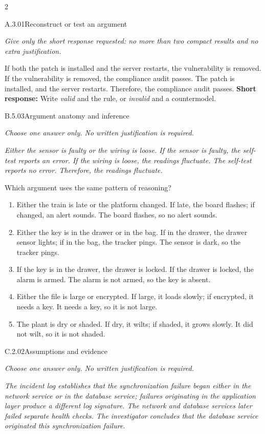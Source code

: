\documentclass[9pt]{extarticle}
\newcommand{\choice}[1]{\item #1}
\begin{document}
\begin{multicols}{2}
\begin{DenseCoreProblem}{A.3.01}{Reconstruct or test an argument}
{\scriptsize\textit{Give only the short response requested: no more than two compact results and no extra justification.}\par}
If both the patch is installed and the server restarts, the vulnerability is removed. If the vulnerability is removed, the compliance audit passes. The patch is installed, and the server restarts. Therefore, the compliance audit passes.
\textbf{Short response:} Write \emph{valid} and the rule, or \emph{invalid} and a countermodel.
\end{DenseCoreProblem}
\begin{DenseCoreProblem}{B.5.03}{Argument anatomy and inference}
{\scriptsize\textit{Choose one answer only. No written justification is required.}\par}
\emph{Either the sensor is faulty or the wiring is loose. If the sensor is faulty, the self-test reports an error. If the wiring is loose, the readings fluctuate. The self-test reports no error. Therefore, the readings fluctuate.}

Which argument uses the same pattern of reasoning?
\begin{enumerate}[label=(\alph*)]
  \choice{Either the train is late or the platform changed. If late, the board flashes; if changed, an alert sounds. The board flashes, so no alert sounds.}
  \choice{Either the key is in the drawer or in the bag. If in the drawer, the drawer sensor lights; if in the bag, the tracker pings. The sensor is dark, so the tracker pings.}
  \choice{If the key is in the drawer, the drawer is locked. If the drawer is locked, the alarm is armed. The alarm is not armed, so the key is absent.}
  \choice{Either the file is large or encrypted. If large, it loads slowly; if encrypted, it needs a key. It needs a key, so it is not large.}
  \choice{The plant is dry or shaded. If dry, it wilts; if shaded, it grows slowly. It did not wilt, so it is not shaded.}
\end{enumerate}
\end{DenseCoreProblem}
\columnbreak
\begin{DenseCoreProblem}{C.2.02}{Assumptions and evidence}
{\scriptsize\textit{Choose one answer only. No written justification is required.}\par}
\emph{The incident log establishes that the synchronization failure began either in the network service or in the database service; failures originating in the application layer produce a different log signature. The network and database services later failed separate health checks. The investigator concludes that the database service originated this synchronization failure.}


\end{DenseCoreProblem}
\end{multicols}
\end{document}
